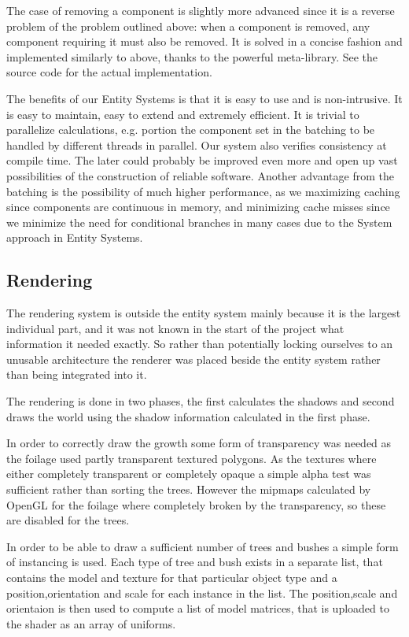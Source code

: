 The case of removing a component is slightly more advanced since it is a reverse problem of the problem outlined above: when a component is removed, any component requiring it must also be removed. It is solved in a concise fashion and implemented similarly to above, thanks to the powerful meta-library. See the source code for the actual implementation.

The benefits of our Entity Systems is that it is easy to use and is non-intrusive. It is easy to maintain, easy to extend and extremely efficient. It is trivial to parallelize calculations, e.g. portion the component set in the batching to be handled by different threads in parallel. Our system also verifies consistency at compile time. The later could probably be improved even more and open up vast possibilities of the construction of reliable software. Another advantage from the batching is the possibility of much higher performance, as we maximizing caching since components are continuous in memory, and minimizing cache misses since we minimize the need for conditional branches in many cases due to the System approach in Entity Systems.

\newpage
\subsection{Rendering}
The rendering system is outside the entity system mainly because it is the largest individual part, and it was not known in the start of the project what information it needed exactly. So rather than potentially locking ourselves to an unusable architecture the renderer was placed beside the entity system rather than being integrated into it.

The rendering is done in two phases, the first calculates the shadows and second draws the world using the shadow information calculated in the first phase.

In order to correctly draw the growth some form of transparency was needed as the foilage used partly transparent textured polygons. As the textures where either completely transparent or completely opaque a simple alpha test was sufficient rather than sorting the trees. However the mipmaps calculated by OpenGL for the foilage where completely broken by the transparency, so these are disabled for the trees.

In order to be able to draw a sufficient number of trees and bushes a simple form of instancing is used. Each type of tree and bush exists in a separate list, that contains the model and texture for that particular object type and a position,orientation and scale for each instance in the list. The position,scale and orientaion is then used to compute a list of model matrices, that is uploaded to the shader as an array of uniforms.

